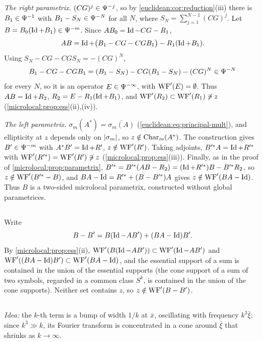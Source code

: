 \emph{The right parametrix.} $(CG)^j\in\Psi^{-j}$, so by \cref{euclidean:cor:reduction}(iii) there is
$B_1\in\Psi^{-1}$ with $B_1-S_N\in\Psi^{-N}$ for all $N$, where $S_N=\sum_{j=1}^{N-1}(CG)^j$. Let
$B=B_0(\operatorname{Id}+B_1)\in\Psi^{-m}$. Since $AB_0=\operatorname{Id}-CG-R_1$,
\begin{equation*}
  AB=\operatorname{Id}+\bigl(B_1-CG-CGB_1\bigr)-R_1(\operatorname{Id}+B_1).
\end{equation*}
Using $S_N-CG-CGS_N=-(CG)^N$,
\begin{equation*}
  B_1-CG-CGB_1=(B_1-S_N)-CG(B_1-S_N)-(CG)^N\in\Psi^{-N}
\end{equation*}
for every $N$, so it is an operator $E\in\Psi^{-\infty}$, with $\operatorname{WF}'(E)=\emptyset$. Thus
$AB=\operatorname{Id}+R_2$, $R_2=E-R_1(\operatorname{Id}+B_1)$, and $\operatorname{WF}'(R_2)\subset\operatorname{WF}'(R_1)\not\ni z$
(\cref{microlocal:prop:ess}(ii),(iv)).

\emph{The left parametrix.} $\sigma_m(A^*)=\overline{\sigma_m(A)}$
(\eqref{euclidean:eq:principal-mult}), and ellipticity at $z$ depends only on $\lvert \sigma_m\rvert$, so
$z\notin\operatorname{Char}_m(A^*)$. The construction gives $B'\in\Psi^{-m}$ with $A^*B'=\operatorname{Id}+R'$,
$z\notin\operatorname{WF}'(R')$. Taking adjoints, $B'^*A=\operatorname{Id}+R'^*$ with $\operatorname{WF}'(R'^*)=\operatorname{WF}'(R')\not\ni z$
(\cref{microlocal:prop:ess}(iii)). Finally, as in the proof of
\cref{microlocal:prop:parametrix},
$B'^*=B'^*(AB-R_2)=(\operatorname{Id}+R'^*)B-B'^*R_2$, so $z\notin\operatorname{WF}'(B'^*-B)$, and
$BA-\operatorname{Id}=R'^*+(B-B'^*)A$ gives $z\notin\operatorname{WF}'(BA-\operatorname{Id})$. Thus $B$ is a two-sided microlocal
parametrix, constructed without global parametrices.

\subsection*{}
Write
\begin{equation*}
  B-B'=B(\operatorname{Id}-AB')+(BA-\operatorname{Id})B'.
\end{equation*}
By \cref{microlocal:prop:ess}(ii), $\operatorname{WF}'(B(\operatorname{Id}-AB'))\subset\operatorname{WF}'(\operatorname{Id}-AB')$ and
$\operatorname{WF}'((BA-\operatorname{Id})B')\subset\operatorname{WF}'(BA-\operatorname{Id})$, and the essential support of a sum is contained in the
union of the essential supports (the cone support of a sum of two symbols, regarded in a common
class $S^k$, is contained in the union of the cone supports). Neither set contains $z$, so
$z\notin\operatorname{WF}'(B-B')$.

\subsection*{}
\emph{Idea:} the $k$-th term is a bump of width $1/k$ at $\bar x$, oscillating with frequency
$k^3\bar\xi$; since $k^3\gg k$, its Fourier transform is concentrated in a cone around
$\bar\xi$ that shrinks as $k\to\infty$.

